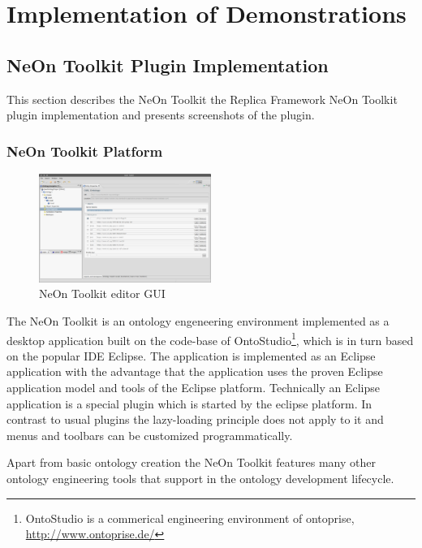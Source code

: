 \chapter{Implementation of Demonstrations}\label{chp-demonstrations}



\section{NeOn Toolkit Plugin Implementation}
This section describes the NeOn Toolkit the Replica Framework NeOn Toolkit
plugin implementation and presents screenshots of the plugin.

\subsection{NeOn Toolkit Platform}
\begin{figure}
        \caption{NeOn Toolkit editor GUI}
        \begin{center}
                \includegraphics[width=0.5\textwidth]{BilderFrontendImpl/editor.png}
        \end{center}
        \label{fig_editor}
\end{figure}
The NeOn Toolkit is an ontology engeneering environment implemented as
a desktop application built on the code-base of 
OntoStudio\footnote{OntoStudio is a commerical engineering environment of 
ontoprise, \url{http://www.ontoprise.de/}}, which is in turn based on the
popular IDE Eclipse. The application is implemented as an
Eclipse application with the advantage that the application uses the proven
Eclipse application model and tools of the Eclipse platform.
Technically an Eclipse application is a special plugin which is started
by the eclipse platform. In contrast to usual plugins the lazy-loading
principle does not apply to it and menus and toolbars can be customized
programmatically.

Apart from basic ontology creation the NeOn Toolkit features many other
ontology engineering tools that support in the ontology development lifecycle.

